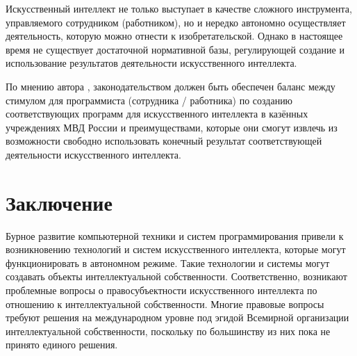 Искусственный интеллект не только выступает в
качестве сложного инструмента, управляемого сотрудником (работником), но и нередко автономно
осуществляет деятельность, которую можно отнести к изобретательской. Однако в настоящее время
не существует достаточной нормативной базы, регулирующей создание и использование
результатов деятельности искусственного интеллекта.

По мнению автора \cite{civil},
законодательством должен быть обеспечен баланс между стимулом для программиста (сотрудника / работника)
по созданию соответствующих программ для искусственного интеллекта в казённых учреждениях МВД России
и преимуществами, которые они смогут извлечь из возможности свободно
использовать конечный результат соответствующей деятельности искусственного интеллекта.
\newpage

\section{Заключение}
Бурное развитие компьютерной техники и систем программирования привели к возникновению технологий и
систем искусственного интеллекта, которые могут функционировать в автономном режиме. Такие технологии
и системы могут создавать объекты интеллектуальной собственности. Соответственно, возникают проблемные
вопросы о правосубъектности искусственного интеллекта по отношению к интеллектуальной собственности.
Многие правовые вопросы требуют решения на международном уровне под эгидой Всемирной организации интеллектуальной
собственности, поскольку по большинству из них пока не принято единого решения.
\newpage

